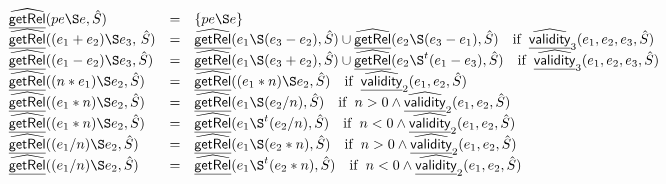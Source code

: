 \documentclass{article}
\newcommand{\ifc}[1]{{\rm if}\begin{array}[t]{l}#1\end{array}}
\newcommand{\owc}{{\rm otherwise}}
\newcommand{\ahf}[1]{\widehat{\underline{\sf #1}}}
\newcommand{\rel}{\S}
\begin{document}
\[\begin{array}{ll}
& \begin{array}{lll}
  \ahf{getRel}(pe \rel e, \hat{S}) &=& \{pe \rel e\}\\
  \ahf{getRel}((e_1 + e_2) \rel e_3, \, \hat{S})  &=& \ahf{getRel} (e_1 \rel (e_3 - e_2), \hat{S}) \cup \ahf{getRel} (e_2 \rel (e_3 - e_1), \hat{S}) \quad \ifc{\ahf{validity}_3(e_1, e_2, e_3, \hat{S})}\\
  \ahf{getRel}((e_1 - e_2) \rel e_3, \hat{S})  &=& \ahf{getRel} (e_1 \rel (e_3 + e_2), \hat{S}) \cup \ahf{getRel} (e_2 \rel^t (e_1 - e_3), \hat{S})\quad \ifc{\ahf{validity}_3(e_1, e_2, e_3, \hat{S})}\\
  \ahf{getRel} ((n * e_1) \rel e_2, \hat{S})  &=& \ahf{getRel} ((e_1  * n) \rel e_2, \hat{S}) \quad \ifc{\ahf{validity}_2(e_1, e_2, \hat{S})}\\
  \ahf{getRel} ((e_1  * n) \rel e_2, \hat{S}) &=& \ahf{getRel} (e_1 \rel (e_2/n), \hat{S}) \quad \ifc {n>0 \land \ahf{validity}_2(e_1, e_2, \hat{S})}\\
  \ahf{getRel} ((e_1  * n) \rel e_2, \hat{S}) &=& \ahf{getRel} (e_1 \rel^t (e_2/n), \hat{S}) \quad \ifc {n<0 \land \ahf{validity}_2(e_1, e_2, \hat{S})}\\
  \ahf{getRel} ((e_1  / n) \rel e_2, \hat{S}) &=& \ahf{getRel} (e_1 \rel (e_2*n), \hat{S}) \quad \ifc {n>0 \land \ahf{validity}_2(e_1, e_2, \hat{S})}\\
  \ahf{getRel} ((e_1  / n) \rel e_2, \hat{S}) &=& \ahf{getRel} (e_1 \rel^t (e_2*n), \hat{S}) \quad \ifc {n<0 \land \ahf{validity}_2(e_1, e_2, \hat{S})}\\
\end{array}\\

\end{array}\]
\end{document}
